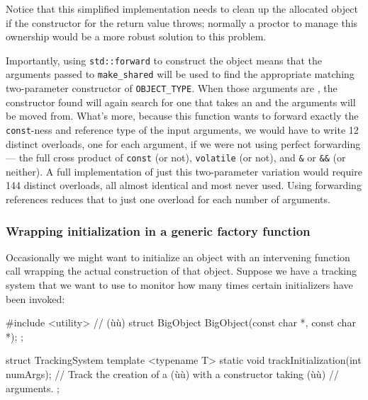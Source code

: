 \noindent Notice that this simplified implementation needs to clean up the allocated object if the
constructor for the return value throws; normally a 
proctor to manage this ownership would be a more robust solution to this
problem.

Importantly, using \lstinline!std::forward! to construct the object
means that the arguments passed to \lstinline!make_shared! will be used to
find the appropriate matching two-parameter constructor of
\lstinline!OBJECT_TYPE!. When those arguments are , the
constructor found will again search for one that takes an 
and the arguments will be moved from. What's more, because this function
wants to forward exactly the \lstinline!const!-ness and reference type of
the input arguments, we would have to write 12 distinct overloads, one for
each argument, if we were not using perfect forwarding --- the full cross
product of \lstinline!const! (or not), \lstinline!volatile! (or not), and
\lstinline!&! or \lstinline!&&! (or neither). A full
implementation of just this two-parameter variation would require 144
distinct overloads, all almost identical and most never 
used. Using forwarding references reduces that to just one 
overload for each number of arguments.

\subsubsection[Wrapping initialization in a generic factory function]{Wrapping initialization in a generic factory function}\label{wrapping-initialization-in-a-generic-factory-function}

Occasionally we might want to initialize an object with an intervening
function call wrapping the actual construction of that object. Suppose
we have a tracking system that we want to use to monitor how many times
certain initializers have been invoked:

\begin{emcppshiddenlisting}[emcppsbatch=e10]
#include <utility>      // (ù{}ù)
struct BigObject {
    BigObject(const char *, const char *);
};
\end{emcppshiddenlisting}
\begin{emcppslisting}[emcppsbatch=e10]
struct TrackingSystem
{
    template <typename T>
    static void trackInitialization(int numArgs);
        // Track the creation of a (ù{}ù) with a constructor taking (ù{}ù)
        // arguments.
};
\end{emcppslisting}

